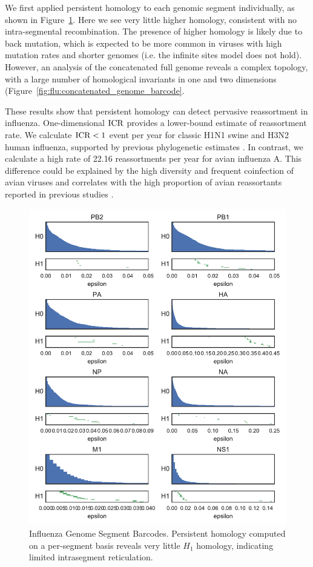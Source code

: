 We first applied persistent homology to each genomic segment individually, as shown in Figure~\ref{fig:flu:segment_barcodes}.
Here we see very little higher homology, consistent with no intra-segmental recombination.
The presence of higher homology is likely due to back mutation, which is expected to be more common in viruses with high mutation rates and shorter genomes (i.e. the infinite sites model does not hold).
However, an analysis of the concatenated full genome reveals a complex topology, with a large number of homological invariants in one and two dimensions (Figure~\ref{fig:flu:concatenated_genome_barcode}.

These results show that persistent homology can detect pervasive reassortment in influenza.
One-dimensional $\operatorname{ICR}$ provides a lower-bound estimate of reassortment rate.
We calculate $\operatorname{ICR} < 1$ event per year for classic H1N1 swine and H3N2 human influenza, supported by previous phylogenetic estimates \cite{Lycett:2012fqa,Holmes:2005cia}.
In contrast, we calculate a high rate of 22.16 reassortments per year for avian influenza A.
This difference could be explained by the high diversity and frequent coinfection of avian viruses \cite{Lubeck:1979ws} and correlates with the high proportion of avian reassortants reported in previous studies \cite{Dugan:2008iba}.

\begin{figure}
\centering
\includegraphics[]{fig/influenza/flu_segment_barcodes.pdf}
\caption[Influenza Genome Segment Barcodes]{Influenza Genome Segment Barcodes. Persistent homology computed on a per-segment basis reveals very little $H_1$ homology, indicating limited intrasegment reticulation.}
\label{fig:flu:segment_barcodes}
\end{figure}


